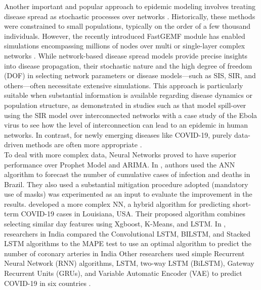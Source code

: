 \documentclass{article}
\begin{document}
Another important and popular approach to epidemic modeling involves treating disease spread as stochastic processes over networks \cite{pastor2015epidemic}. Historically, these methods were constrained to small populations, typically on the order of a few thousand individuals. However, the recently introduced FastGEMF module has enabled simulations encompassing millions of nodes over multi or single-layer complex networks \cite{10876117}. While network-based disease spread models provide precise insights into disease propagation, their stochastic nature and the high degree of freedom (DOF) in selecting network parameters or disease models—such as SIS, SIR, and others—often necessitate extensive simulations. This approach is particularly suitable when substantial information is available regarding disease dynamics or population structure, as demonstrated in studies such as \cite{das2024sir} that model spill-over using the SIR model over interconnected networks with a case study of the Ebola virus to see how the level of interconnection can lead to an epidemic in human networks. In contrast, for newly emerging diseases like COVID-19, purely data-driven methods are often more appropriate \cite{XU2022105342}.\\

To deal with more complex data, Neural Networks proved to have superior performance over Prophet Model and ARIMA\cite{bengio2013representation,schmidhuber2015deep,tygert2016mathematical}. In \cite{de2022covid}, authors used the ANN algorithm to forecast the number of cumulative cases of infection and deaths in Brazil. They also used a substantial mitigation procedure adopted (mandatory use of masks) was experimented as an input to evaluate the improvement in the results. \cite{vadyala2021prediction} developed a more complex NN, a hybrid algorithm for predicting short-term COVID-19 cases in Louisiana, USA. Their proposed algorithm combines selecting similar day features using Xgboost, K-Means, and LSTM. In \cite{arora2020prediction}, researchers in India compared the Convolutional LSTM, BILSTM, and Stacked LSTM algorithms to the MAPE test to use an optimal algorithm to predict the number of coronary arteries in India Other researchers used simple Recurrent Neural Network (RNN) algorithms, LSTM, two-way LSTM (BiLSTM), Gateway Recurrent Units (GRUs), and Variable Automatic Encoder (VAE) to predict COVID-19 in six countries \cite{zeroual2020deep}.\\
\end{document}
